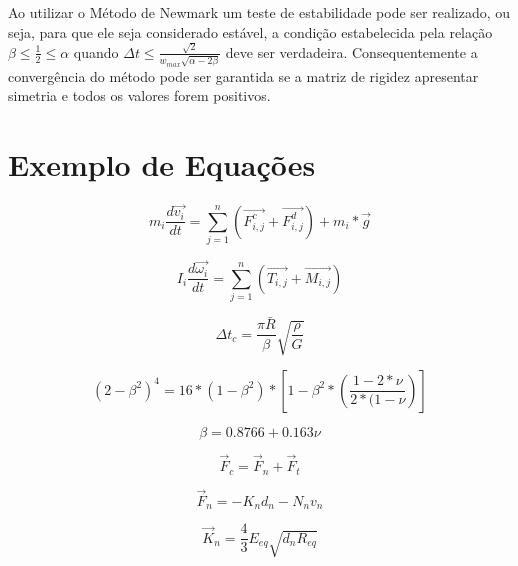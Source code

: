 		Ao utilizar o Método de Newmark um teste de estabilidade pode ser realizado, ou seja, para que ele seja considerado estável, a condição estabelecida pela relação $ \beta \leq \frac{1}{2} \leq \alpha $ quando $ \Delta t \leq \frac{\sqrt{2}}{w_{max} \sqrt{ \alpha - 2 \beta}} $ deve ser verdadeira. Consequentemente a convergência do método pode ser garantida se a matriz de rigidez apresentar simetria e todos os valores forem positivos.
			
	\section{\esp Exemplo de Equações}\label{section:2.1}
		
		\begin{equation}\label{eq2.9}
			m_{i}\frac{d\vec{v_{i}}}{dt} = \sum_{j=1}^{n}  \left( \vec{F^c_{i,j}}+\vec{F^d_{i,j}} \right) + m_{i}*\vec{g}
		\end{equation}

		\begin{equation}\label{eq2.10}
			I_{i}\frac{d\vec{\omega_{i}}}{dt} = \sum_{j=1}^{n}(\vec{T_{i,j}}+\vec{M_{i,j}})
		\end{equation}
		
		\begin{equation}\label{eq2.11}
			\Delta t_c = \frac{\pi \bar{R}}{\beta} \sqrt{\frac{\rho}{G}}
		\end{equation}
		
		\begin{equation}\label{2.12}
			(2 - \beta^2)^4 = 16*(1-\beta^2)*\left[ 1 - \beta^2* \left( \frac{1 - 2*\nu}{2*(1-\nu} \right) \right]
		\end{equation}
		
		\begin{equation}\label{2.13}
			\beta = 0.8766 + 0.163 \nu
		\end{equation}
		
		\begin{equation}\label{eq2.14}
				\vec{F}_{c} = \vec{F}_{n} + \vec{F}_{t}
		\end{equation}
		
		\begin{equation}\label{eq2.15}
					\vec{F}_{n} = -K_n d_n - N_n v_n
		\end{equation}
		
		\begin{equation}\label{eq2.16}
				\vec{K}_{n} = \frac{4}{3}E_{eq}\sqrt{d_{n}R_{eq}}
		\end{equation}
		
